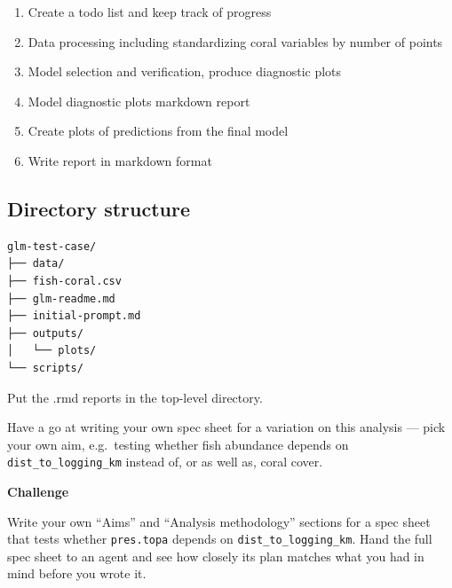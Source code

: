 \documentclass[
  letterpaper,
  DIV=11,
  numbers=noendperiod]{scrreprt}
\providecommand{\tightlist}{%
  \setlength{\itemsep}{0pt}\setlength{\parskip}{0pt}}
\begin{document}
\begin{tcolorbox}
\begin{enumerate}
\def\labelenumi{\arabic{enumi}.}
\tightlist
\item
  Create a todo list and keep track of progress
\item
  Data processing including standardizing coral variables by number of
  points
\item
  Model selection and verification, produce diagnostic plots
\item
  Model diagnostic plots markdown report
\item
  Create plots of predictions from the final model
\item
  Write report in markdown format
\end{enumerate}

\subsection{Directory structure}\label{directory-structure-1}

\begin{verbatim}
glm-test-case/
├── data/
├── fish-coral.csv
├── glm-readme.md
├── initial-prompt.md
├── outputs/
│   └── plots/
└── scripts/
\end{verbatim}

Put the .rmd reports in the top-level directory.

\end{tcolorbox}

Have a go at writing your own spec sheet for a variation on this
analysis --- pick your own aim, e.g.~testing whether fish abundance
depends on \texttt{dist\_to\_logging\_km} instead of, or as well as,
coral cover.

\begin{tcolorbox}[enhanced jigsaw, toprule=.15mm, rightrule=.15mm, left=2mm, leftrule=.75mm, breakable, opacityback=0, arc=.35mm, colframe=quarto-callout-important-color-frame, bottomrule=.15mm, colback=white]
\begin{minipage}[t]{5.5mm}
\textcolor{quarto-callout-important-color}{\faExclamation}
\end{minipage}%
\begin{minipage}[t]{\textwidth - 5.5mm}

\vspace{-3mm}\textbf{Challenge}\vspace{3mm}

Write your own ``Aims'' and ``Analysis methodology'' sections for a spec
sheet that tests whether \texttt{pres.topa} depends on
\texttt{dist\_to\_logging\_km}. Hand the full spec sheet to an agent and
see how closely its plan matches what you had in mind before you wrote
it.

\end{minipage}%
\end{tcolorbox}
\end{document}
